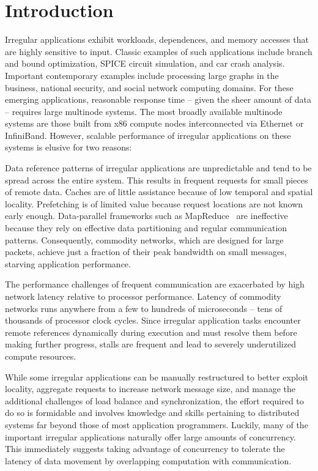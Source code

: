 \section{Introduction} \label{sec:intro}

Irregular applications exhibit workloads, dependences, and memory accesses
that are highly sensitive to input. Classic examples of such applications
include branch and bound optimization, SPICE circuit simulation, and car crash
analysis. Important contemporary examples include processing large graphs in
the business, national security, and social network computing domains. For
these emerging applications, reasonable response time -- given the sheer
amount of data -- requires large multinode systems. The most broadly available
multinode systems are those built from x86 compute nodes interconnected via
Ethernet or InfiniBand. However, scalable performance of irregular
applications on these systems is elusive for two reasons:

\vspace{0.5ex}
 Data reference patterns of irregular applications are unpredictable and tend to be spread across the entire system. This results in frequent requests for small pieces of remote data. Caches are of little assistance because of low temporal and spatial locality. Prefetching is of limited value because request locations are not known early enough. Data-parallel frameworks such as MapReduce~\cite{Dean:2008:MSD:1327452.1327492} are ineffective because they rely on effective data partitioning and regular communication patterns. Consequently, commodity networks, which are designed for large packets, achieve just a fraction of their peak bandwidth on small messages, starving application performance.

\vspace{0.5ex}  The performance challenges of frequent communication are exacerbated by high network latency relative to processor performance. Latency of commodity networks runs anywhere from a few to hundreds of microseconds -- tens of thousands of processor clock cycles.  Since irregular application tasks encounter remote references dynamically during execution and must resolve them before making further progress, stalls are frequent and lead to severely underutilized compute resources.

While some irregular applications can be manually restructured to better exploit locality, aggregate requests to increase network message size, and manage the additional challenges of load balance and synchronization, the effort required to do so is formidable and involves knowledge and skills pertaining to distributed systems far beyond those of most application programmers. Luckily, many of the important irregular applications naturally offer large amounts of concurrency. This immediately suggests taking advantage of concurrency to tolerate the latency of data movement by overlapping computation with communication.

